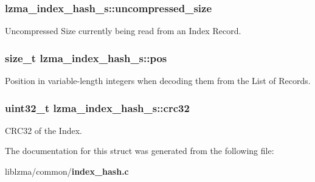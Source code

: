 \subsubsection[{uncompressed\-\_\-size}]{ lzma\-\_\-index\-\_\-hash\-\_\-s\-::uncompressed\-\_\-size}\label{structlzma__index__hash__s_a6001472cdcba7a6fee214b295fd81a2d}


Uncompressed Size currently being read from an Index Record. 

\subsubsection[{pos}]{\setlength{\rightskip}{0pt plus 5cm}size\-\_\-t lzma\-\_\-index\-\_\-hash\-\_\-s\-::pos}\label{structlzma__index__hash__s_ac63219f34e9a2524d23b0593b174790d}
Position in variable-\/length integers when decoding them from the List of Records. 
\subsubsection[{crc32}]{\setlength{\rightskip}{0pt plus 5cm}uint32\-\_\-t lzma\-\_\-index\-\_\-hash\-\_\-s\-::crc32}\label{structlzma__index__hash__s_a6f60785c4fd00c44fc1f272c733c2f97}


C\-R\-C32 of the Index. 



The documentation for this struct was generated from the following file\-:\begin{DoxyCompactItemize}
\item 
liblzma/common/{\bf index\-\_\-hash.\-c}\end{DoxyCompactItemize}
